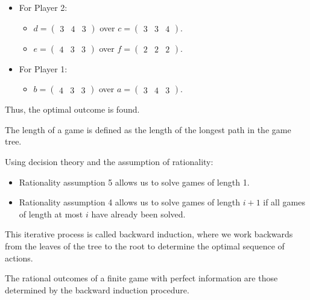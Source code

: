 \begin{example}
\begin{itemize}
\begin{itemize}
            \end{itemize}
        \item For Player 2: 
            \begin{itemize}
                \item $d = \begin{pmatrix} 3 & 4 & 3 \end{pmatrix}$ over $c = \begin{pmatrix} 3 & 3 & 4 \end{pmatrix}$.
                \item $e = \begin{pmatrix} 4 & 3 & 3 \end{pmatrix}$ over $f = \begin{pmatrix} 2 & 2 & 2 \end{pmatrix}$.
            \end{itemize}
        \item For Player 1:
            \begin{itemize}
                \item $b = \begin{pmatrix} 4 & 3 & 3 \end{pmatrix}$ over $a = \begin{pmatrix} 3 & 4 & 3 \end{pmatrix}$.
            \end{itemize}
    \end{itemize}
    Thus, the optimal outcome is found. 
\end{example}
\begin{definition}
    The length of a game is defined as the length of the longest path in the game tree.
\end{definition}
Using decision theory and the assumption of rationality:
\begin{itemize}
    \item Rationality assumption 5 allows us to solve games of length 1.
    \item Rationality assumption 4 allows us to solve games of length $i + 1$ if all games of length at most $i$ have already been solved.
\end{itemize}
This iterative process is called backward induction, where we work backwards from the leaves of the tree to the root to determine the optimal sequence of actions.
\begin{theorem}
    The rational outcomes of a finite game with perfect information are those determined by the backward induction procedure.
\end{theorem}

